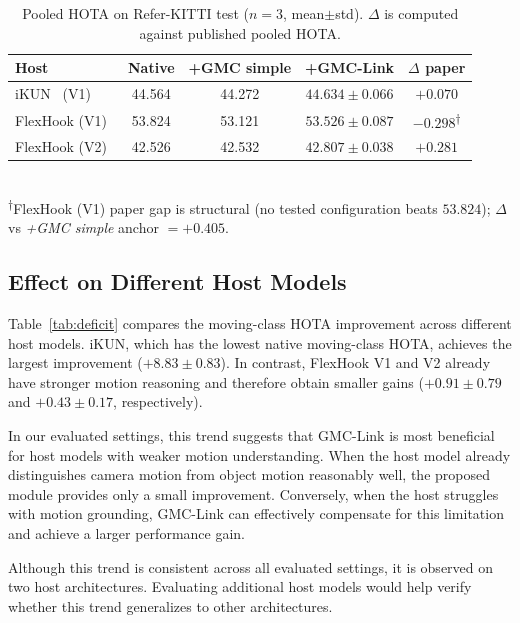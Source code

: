 \documentclass[sigconf,anonymous,nonacm]{acmart}
\begin{document}
\begin{table}[t]
\centering
\caption{Pooled HOTA on Refer-KITTI test ($n{=}3$, mean$\pm$std). $\Delta$ is computed against published pooled HOTA.}
\label{tab:main}
\small
\setlength{\tabcolsep}{4pt}
\begin{tabular}{lcccc}
\toprule
Host & Native & +GMC simple & +GMC-Link & $\Delta$ paper \\
\midrule
iKUN~\cite{ikun} (V1)        & 44.564 & 44.272 & $44.634 \pm 0.066$ & $+0.070$ \\
FlexHook (V1)~\cite{flexhook}  & 53.824 & 53.121 & $53.526 \pm 0.087$ & $-0.298$\textsuperscript{$\dagger$} \\
FlexHook (V2)~\cite{flexhook}  & 42.526 & 42.532 & $42.807 \pm 0.038$ & $+0.281$ \\
\bottomrule
\end{tabular}
\\[2pt]
{\footnotesize \textsuperscript{$\dagger$}FlexHook (V1) paper gap is structural (no tested configuration beats $53.824$); $\Delta$ vs \emph{+GMC simple} anchor $= +0.405$.}
\end{table}

\subsection{Effect on Different Host Models}
\label{sec:deficit}

Table~\ref{tab:deficit} compares the moving-class HOTA improvement across different host models. iKUN, which has the lowest native moving-class HOTA, achieves the largest improvement ($+8.83 \pm 0.83$). In contrast, FlexHook V1 and V2 already have stronger motion reasoning and therefore obtain smaller gains ($+0.91 \pm 0.79$ and $+0.43 \pm 0.17$, respectively).

In our evaluated settings, this trend suggests that GMC-Link is most beneficial for host models with weaker motion understanding. When the host model already distinguishes camera motion from object motion reasonably well, the proposed module provides only a small improvement. Conversely, when the host struggles with motion grounding, GMC-Link can effectively compensate for this limitation and achieve a larger performance gain.

Although this trend is consistent across all evaluated settings, it is observed on two host architectures. Evaluating additional host models would help verify whether this trend generalizes to other architectures.
\end{document}
